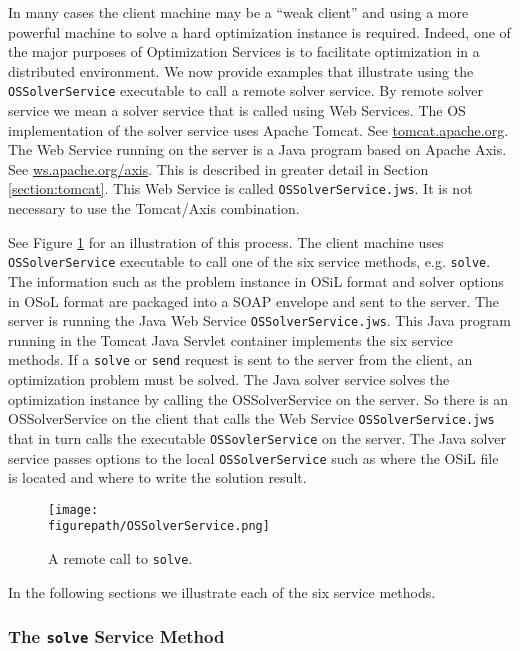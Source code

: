 \documentclass[11pt]{article}
\newcommand{\figurepath}{./figures}
\newcounter{Fig}
\renewcommand{\_}{{\char"5F}}
\renewcommand{\{}{{\char"7B}}
\renewcommand{\}}{{\char"7D}}
\renewcommand{\^}{{\char"0D}}
\renewcommand{\'}{{\char"0D}}
\begin{document}
In many cases the client machine may be a ``weak client'' and  using a more powerful machine to solve a hard optimization instance is required. Indeed, one of the major purposes of Optimization Services is to facilitate optimization in a distributed environment.   We now provide examples that illustrate using the {\tt OSSolverService} executable to call a remote solver service.   By remote solver service we mean a solver service that is called using Web Services.  The OS implementation  of the solver service  uses Apache Tomcat. See \url{tomcat.apache.org}. The Web Service running on the server is a Java program based on Apache Axis. See \url{ws.apache.org/axis}. This is described in greater detail in Section \ref{section:tomcat}.  This Web Service is called {\tt OSSolverService.jws}. It is not necessary to use the Tomcat/Axis combination.



See Figure \ref{figure:ossolverservice} for an illustration of this process. The client machine uses {\tt OSSolverService} executable to call one of the six service methods, e.g. {\tt solve}. The  information such as the problem instance in OSiL format and solver options in OSoL format are packaged into a SOAP envelope and sent to the server. The server is running the Java Web Service {\tt OSSolverService.jws}. This Java program running in the Tomcat Java Servlet container implements the six service methods. If a {\tt solve} or {\tt send} request is sent to the server from the client, an optimization problem must be solved. The Java solver service solves the optimization instance by  calling the  OSSolverService on the server. So there is an OSSolverService on the client that calls the Web Service {\tt  OSSolverService.jws} that in turn calls  the executable {\tt OSSovlerService} on the server. The Java solver service passes options to the local {\tt OSSolverService} such as where the OSiL file is located and where to write the solution result.

\begin{figure}
\centering
\texttt{[image: \\figurepath/OSSolverService.png]}
\caption{A remote call to {\tt solve}.}
\label{figure:ossolverservice}
\end{figure}


In the following sections we illustrate each of the six service methods.

\subsubsection{The  {\tt solve} Service Method}\label{section:solve}
\end{document}
